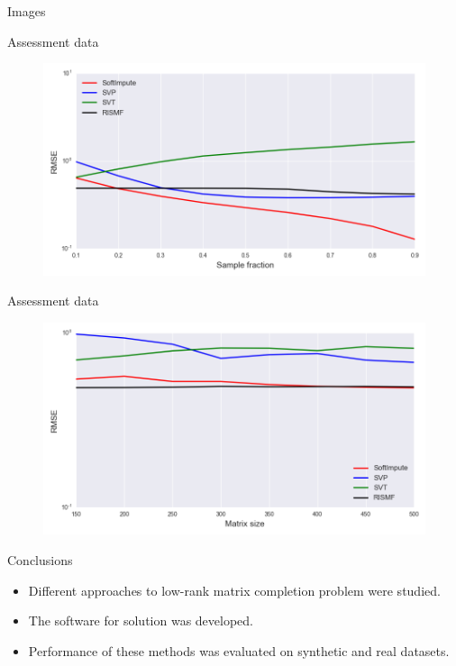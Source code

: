 \documentclass{beamer}
\begin{document}
\begin{frame}{Images}
\begin{multicols}{3}
\begin{figure}[h]
		\end{figure}
	\end{multicols}
	
\end{frame}
\begin{frame}{Assessment data}
	\begin{figure}[h]
		\centering
		\includegraphics[width=\linewidth]{./../results/real/exper_1/real_nsamp_rmse.png}
	\end{figure}
\end{frame}
\begin{frame}{Assessment data}
	\begin{figure}[h]
		\centering
		\includegraphics[width=\linewidth]{./../results/real/exper_3/real_size_rmse.png}
	\end{figure}
\end{frame}
\begin{frame}{Conclusions}
	\begin{itemize}
		\item Different approaches to low-rank matrix completion problem were studied.
		\item The software for solution was developed.
		\item Performance of these methods was evaluated on synthetic and real datasets.
	\end{itemize}
\end{frame}
\end{document}
